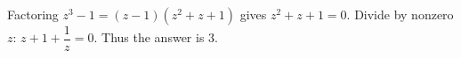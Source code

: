 Factoring $z^3-1=(z-1)(z^2+z+1)$ gives $z^2+z+1=0$. Divide by nonzero $z$: $z+1+\dfrac{1}{z}=0$. Thus the answer is $\boxed3$.
